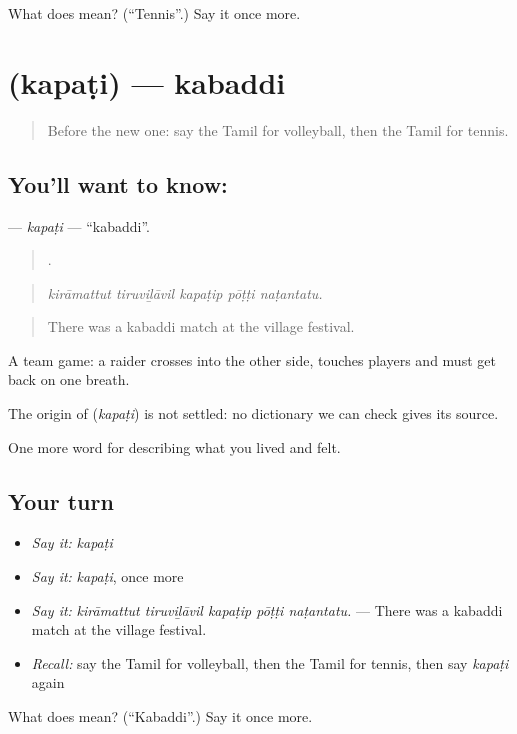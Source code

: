 \begin{tcolorbox}[breakable,colback=teal!4,colframe=teal!35!black,title={Before you move on}]
What does  mean? (\textquotedblleft{}Tennis\textquotedblright{}.) Say it once more.
\end{tcolorbox}
\section[\texorpdfstring{\ta{கபடி} (kapaṭi)}{கபடி (kapaṭi)}]{ (kapaṭi) — kabaddi}

\label{lesson:TA-C531-kapati}



\begin{quote}
Before the new one: say the Tamil for volleyball, then the Tamil for tennis.
\end{quote}

\subsection*{You'll want to know: }
\textbf{} — \emph{kapaṭi} — \textquotedblleft{}kabaddi\textquotedblright{}.

\begin{quote}
    .
\end{quote}

\begin{quote}
\emph{kirāmattut tiruviḻāvil kapaṭip pōṭṭi naṭantatu.}
\end{quote}

\begin{quote}
There was a kabaddi match at the village festival.
\end{quote}

A team game: a raider crosses into the other side, touches players and must get back on one breath.

\begin{cousinweb}
The origin of \textbf{} (\emph{kapaṭi}) is not settled: no dictionary we can check gives its source.
\end{cousinweb}

\begin{grammarlens}[title={What you've built}]
One more word for describing what you lived and felt.
\end{grammarlens}

\subsection*{Your turn}
\begin{itemize}
\raggedright
  \item \emph{Say it:} \emph{kapaṭi}
  \item \emph{Say it:} \emph{kapaṭi}, once more
  \item \emph{Say it:} \emph{kirāmattut tiruviḻāvil kapaṭip pōṭṭi naṭantatu.} — There was a kabaddi match at the village festival.
  \item \emph{Recall:} say the Tamil for volleyball, then the Tamil for tennis, then say \emph{kapaṭi} again
\end{itemize}

\begin{tcolorbox}[breakable,colback=teal!4,colframe=teal!35!black,title={Before you move on}]
What does  mean? (\textquotedblleft{}Kabaddi\textquotedblright{}.) Say it once more.
\end{tcolorbox}
